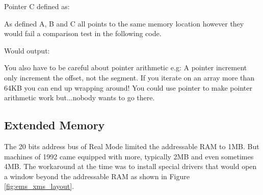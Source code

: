 \documentclass[book.tex]{subfiles}
\begin{document}
\bigskip

Pointer C defined as:\\
\par
\begin{minipage}{\textwidth}

\end{minipage}

As defined A, B and C all points to the same memory location however they would fail a comparison test in the following code.\\

\begin{minipage}{\textwidth}

\end{minipage}
Would output:\\

\begin{minipage}{\textwidth}

\end{minipage}
\par

 You also have to be careful about pointer arithmetic e.g: A  pointer increment only increment the offset, not the segment. If you iterate on an array more than 64KB you can end up wrapping around! You could use  pointer to make pointer arithmetic work but...nobody wants to go there.




  \subsection{Extended Memory}

The 20 bits address bus of Real Mode limited the addressable RAM to 1MB. But machines of 1992 came equipped with more, typically 2MB and even sometimes 4MB. The workaround at the time was to install special drivers that would open a window beyond the addressable RAM as shown in Figure \ref{fig:ems_xms_layout}.
\end{document}
